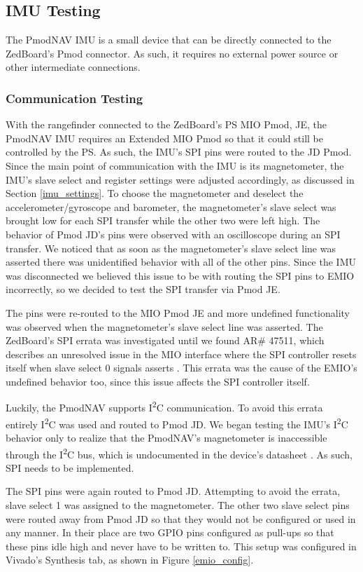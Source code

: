 \subsection{IMU Testing}
The PmodNAV IMU is a small device that can be directly connected to the ZedBoard's Pmod connector. As such, it requires no external power source or other intermediate connections.

\subsubsection{Communication Testing}
With the rangefinder connected to the ZedBoard's PS MIO Pmod, JE, the PmodNAV IMU requires an Extended MIO Pmod so that it could still be controlled by the PS. As such, the IMU's SPI pins were routed to the JD Pmod. Since the main point of communication with the IMU is its magnetometer, the IMU's slave select and register settings were adjusted accordingly, as discussed in Section \ref{imu_settings}. To choose the magnetometer and deselect the accelerometer/gyroscope and barometer, the magnetometer's slave select was brought low for each SPI transfer while the other two were left high. The behavior of Pmod JD's pins were observed with an oscilloscope during an SPI transfer. We noticed that as soon as the magnetometer's slave select line was asserted there was unidentified behavior with all of the other pins. Since the IMU was disconnected we believed this issue to be with routing the SPI pins to EMIO incorrectly, so we decided to test the SPI transfer via Pmod JE.
\par
The pins were re-routed to the MIO Pmod JE and more undefined functionality was observed when the magnetometer's slave select line was asserted. The ZedBoard's SPI errata was investigated until we found AR\# 47511, which describes an unresolved issue in the MIO interface where the SPI controller resets itself when slave select 0 signals asserts \cite{zedboardErrata}. This errata was the cause of the EMIO's undefined behavior too, since this issue affects the SPI controller itself.
\par
Luckily, the PmodNAV supports I\textsuperscript{2}C communication. To avoid this errata entirely I\textsuperscript{2}C was used and routed to Pmod JD. We began testing the IMU's I\textsuperscript{2}C behavior only to realize that the PmodNAV's magnetometer is inaccessible through the I\textsuperscript{2}C bus, which is undocumented in the device's datasheet \cite{lsm9ds1}. As such, SPI needs to be implemented.
\par
The SPI pins were again routed to Pmod JD. Attempting to avoid the errata, slave select 1 was assigned to the magnetometer. The other two slave select pins were routed away from Pmod JD so that they would not be configured or used in any manner. In their place are two GPIO pins configured as pull-ups so that these pins idle high and never have to be written to. This setup was configured in Vivado's Synthesis tab, as shown in Figure \ref{emio_config}. 

